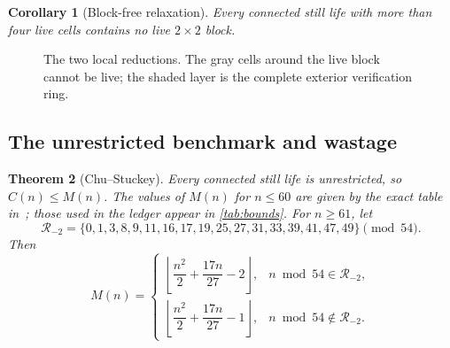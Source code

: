 \documentclass[10pt]{article}
\newtheorem{theorem}{Theorem}[section]
\newtheorem{corollary}[theorem]{Corollary}
\theoremstyle{remark}
\newcommand{\B}{\mathcal B}
\newcommand{\Rminus}{\mathcal R_{-2}}
\begin{document}
\begin{corollary}[Block-free relaxation]\label{cor:block-free}
Every connected still life with more than four live cells contains no live
$2\times2$ block.
\end{corollary}

\begin{figure}[t]
\centering
{}
\caption{The two local reductions.  The gray cells around the live block
cannot be live; the shaded layer is the complete exterior verification ring.}
\label{fig:local-reductions}
\end{figure}

\subsection{The unrestricted benchmark and wastage}\label{sec:wastage}

\begin{theorem}[Chu--Stuckey]\label{thm:chu}
Every connected still life is unrestricted, so $C(n)\le M(n)$.  The values of
$M(n)$ for $n\le60$ are given by the exact table in~\cite{chu-stuckey-2012};
those used in the ledger appear in \cref{tab:bounds}.  For $n\ge61$, let
\[
\Rminus=\{0,1,3,8,9,11,16,17,19,25,27,31,33,39,41,47,49\}
 \pmod {54}.
\]
Then
\begin{equation}\label{eq:chu-formula}
M(n)=
\begin{cases}
\left\lfloor\dfrac{n^2}{2}+\dfrac{17n}{27}-2\right\rfloor,
 & n\bmod54\in\Rminus,\\[6pt]
\left\lfloor\dfrac{n^2}{2}+\dfrac{17n}{27}-1\right\rfloor,
 & n\bmod54\notin\Rminus.
\end{cases}
\end{equation}
\end{theorem}
\end{document}
